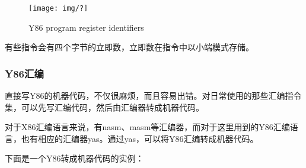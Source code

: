 \documentclass[12pt]{article}
\begin{document}
\begin{CJK*}{GB}{gbsn}
\begin{figure}[htbp]
\centering
\texttt{[image: img/?]}
\caption{Y86 program register identifiers}
\end{figure}

有些指令会有四个字节的立即数，立即数在指令中以小端模式存储。

\subsubsection{Y86汇编}\label{y86ux6c47ux7f16}

直接写Y86的机器代码，不仅很麻烦，而且容易出错。对日常使用的那些汇编指令集，可以先写汇编代码，然后由汇编器转成机器代码。

对于X86汇编语言来说，有nasm、masm等汇编器，而对于这里用到的Y86汇编语言，也有相应的汇编器yas。通过yas，可以将Y86汇编转成机器代码。

下面是一个Y86转成机器代码的实例：


\end{CJK*}
\end{document}
